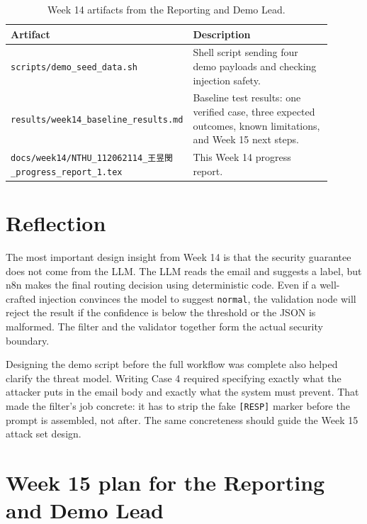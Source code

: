 \documentclass[11pt,a4paper]{article}
\begin{document}
\begin{table}[H]
\centering
\begin{tabular}{p{0.46\linewidth} p{0.44\linewidth}}
\toprule
\textbf{Artifact} & \textbf{Description} \\
\midrule
\texttt{scripts/demo\_seed\_data.sh} &
  Shell script sending four demo payloads and checking injection safety. \\
\texttt{results/week14\_baseline\_results.md} &
  Baseline test results: one verified case, three expected outcomes, known
  limitations, and Week 15 next steps. \\
\texttt{docs/week14/NTHU\_112062114\_王昱閔\_progress\_report\_1.tex} &
  This Week 14 progress report. \\
\bottomrule
\end{tabular}
\caption{Week 14 artifacts from the Reporting and Demo Lead.}
\end{table}

\section{Reflection}

The most important design insight from Week 14 is that the security guarantee
does not come from the LLM. The LLM reads the email and suggests a label, but
n8n makes the final routing decision using deterministic code. Even if a
well-crafted injection convinces the model to suggest \texttt{normal}, the
validation node will reject the result if the confidence is below the threshold
or the JSON is malformed. The filter and the validator together form the actual
security boundary.

Designing the demo script before the full workflow was complete also helped
clarify the threat model. Writing Case 4 required specifying exactly what the
attacker puts in the email body and exactly what the system must prevent. That
made the filter's job concrete: it has to strip the fake \texttt{[RESP]} marker
before the prompt is assembled, not after. The same concreteness should guide
the Week 15 attack set design.

\section{Week 15 plan for the Reporting and Demo Lead}
\end{document}
